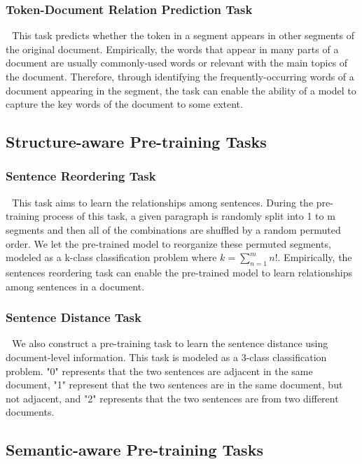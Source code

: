 \documentclass[letterpaper]{article} \usepackage{aaai20}  \usepackage{times}  \usepackage{helvet} \usepackage{courier}  \usepackage[hyphens]{url}  \usepackage{graphicx} \usepackage{makecell}
\begin{document}
\subsubsection{Token-Document Relation Prediction Task}  \,\,
This task predicts whether the token in a segment appears in other segments of the original document. Empirically, the words that appear in many parts of a document are usually commonly-used words or relevant with the main topics of the document. Therefore, through identifying the frequently-occurring words of a document appearing in the segment, the task can enable the ability of a model to capture the key words of the document to some extent.

\subsection{Structure-aware Pre-training Tasks}

\subsubsection{Sentence Reordering Task} \,\, 
This task aims to learn the relationships among sentences. During the pre-training process of this task, a given paragraph is randomly split into 1 to m segments and then all of the combinations are shuffled by a random permuted order. We let the pre-trained model to reorganize these permuted segments, modeled as a k-class classification problem where \begin{math} k=\sum_{n=1}^{m} n!\end{math}. Empirically, the sentences reordering task can enable the pre-trained model to learn relationships among sentences in a document.


\subsubsection{Sentence Distance Task} \,\, 
We also construct a pre-training task to learn the sentence distance using document-level information. This task is modeled as a 3-class classification problem. "0" represents that the two sentences are adjacent in the same document, "1" represent that the two sentences are in the same document, but not adjacent, and "2" represents that the two sentences are from two different documents.

\subsection{Semantic-aware Pre-training Tasks}
\end{document}
